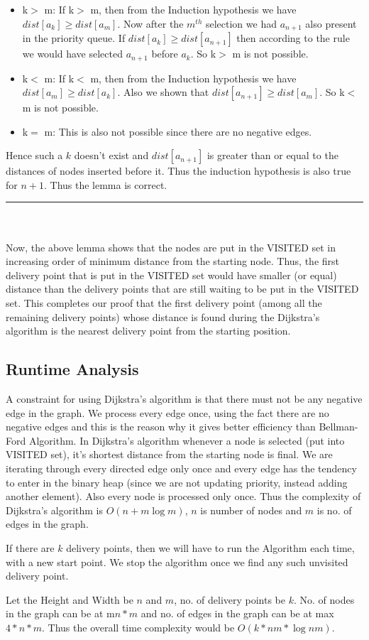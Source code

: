 \documentclass{article}
\begin{document}
\begin{itemize}
    \item k$>$ m: If k$>$ m, then from the Induction hypothesis we have $dist[a_{k}] \ge dist[a_m]$. Now after the $m^{th}$ selection we had $a_{n+1}$ also present in the priority queue. If $dist[a_k] \ge dist[a_{n+1}]$ then according to the rule we would have selected $a_{n+1}$ before $a_k$. So k$>$ m is not possible.
    \item k$<$ m: If k$<$ m, then from the Induction hypothesis we have $dist[a_{m}] \ge dist[a_k]$. Also we shown that $dist[a_{n+1}] \ge dist[a_m]$. So k$<$ m is not possible.
    \item k$=$ m: This is also not possible since there are no negative edges.
\end{itemize}
Hence such a $k$ doesn't exist and $dist[a_{n+1}]$ is greater than or equal to the distances of nodes inserted before it. Thus the induction hypothesis is also true for $n+1$. Thus the lemma is correct.
\par\noindent\rule{\textwidth}{0.4pt}
\\\\
Now, the above lemma shows that the nodes are put in the VISITED set in increasing order of minimum distance from the starting node. Thus, the first delivery point that is put in the VISITED set would have smaller (or equal) distance than the delivery points that are still waiting to be put in the VISITED set. This completes our proof that the first delivery point (among all the remaining delivery points) whose distance is found during the Dijkstra's algorithm is the nearest delivery point from the starting position.




\subsection{Runtime Analysis}
A constraint for using Dijkstra's algorithm is that there must not be any negative edge in the graph. We process every edge once, using the fact there are no negative edges and this is the reason why it gives better efficiency than Bellman-Ford Algorithm. In Dijkstra's algorithm whenever a node is selected (put into VISITED set), it's shortest distance from the starting node is final. We are iterating through every directed edge only once and every edge has the tendency to enter in the binary heap (since we are not updating priority, instead adding another element). Also every node is processed only once. Thus the complexity of Dijkstra's algorithm is $O(n + m\log m)$, $n$ is number of nodes and $m$ is no. of edges in the graph.
\\
\par If there are $k$ delivery points, then we will have to run the Algorithm each time, with a new start point. We stop the algorithm once we find any such unvisited delivery point. 
\\
\par Let the Height and Width be $n$ and $m$, no. of delivery points be $k$. No. of nodes in the graph can be at m$n*m$ and no. of edges in the graph can be at max $4*n*m$. Thus the overall time complexity would be \textbf{$O(k*nm*\log nm)$}.
\end{document}
